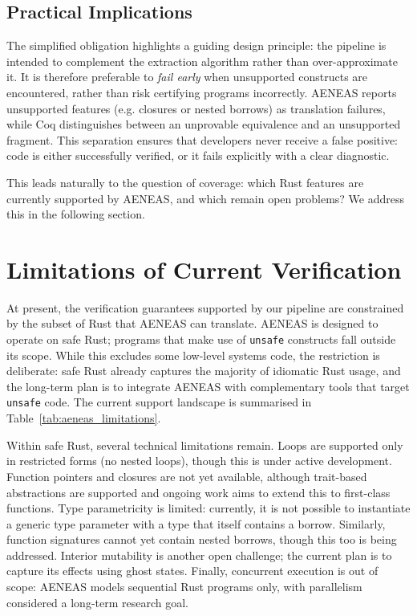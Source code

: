 \subsection{Practical Implications}
The simplified obligation highlights a guiding design principle: the pipeline is
intended to complement the extraction algorithm rather than over-approximate it.
It is therefore preferable to \textit{fail early} when unsupported constructs
are encountered, rather than risk certifying programs incorrectly. AENEAS
reports unsupported features (e.g. closures or nested borrows) as translation
failures, while Coq distinguishes between an unprovable equivalence and an
unsupported fragment. This separation ensures that developers never receive a
false positive: code is either successfully verified, or it fails explicitly
with a clear diagnostic.

This leads naturally to the question of coverage: which Rust features are
currently supported by AENEAS, and which remain open problems? We address this
in the following section.

\section{Limitations of Current Verification}
\label{sec:limitations_verification}

At present, the verification guarantees supported by our pipeline are
constrained by the subset of Rust that AENEAS can translate. AENEAS is designed
to operate on safe Rust; programs that make use of \texttt{unsafe} constructs
fall outside its scope. While this excludes some low-level systems code, the
restriction is deliberate: safe Rust already captures the majority of idiomatic
Rust usage, and the long-term plan is to integrate AENEAS with complementary
tools that target \texttt{unsafe} code. The current support landscape is
summarised in Table~\ref{tab:aeneas_limitations}.

Within safe Rust, several technical limitations remain. Loops are supported only
in restricted forms (no nested loops), though this is under active development.
Function pointers and closures are not yet available, although trait-based
abstractions are supported and ongoing work aims to extend this to first-class
functions. Type parametricity is limited: currently, it is not possible to
instantiate a generic type parameter with a type that itself contains a borrow.
Similarly, function signatures cannot yet contain nested borrows, though this
too is being addressed. Interior mutability is another open challenge; the
current plan is to capture its effects using ghost states. Finally, concurrent
execution is out of scope: AENEAS models sequential Rust programs only, with
parallelism considered a long-term research goal.

